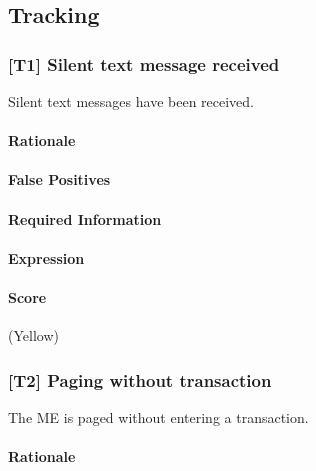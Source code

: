 \documentclass[a4paper,11pt,notitlepage,bigheadings,oneside]{scrartcl}
\begin{document}
\TBD{}

\subsection{Tracking}

\subsubsection{[T1] Silent text message received}

Silent text messages have been received.

\paragraph{Rationale}

\TBD{}

\paragraph{False Positives}


\paragraph{Required Information}

\TBD{}

\paragraph{Expression}

\TBD{}

\paragraph{Score}

\TBD{} (Yellow)

\subsubsection{[T2] Paging without transaction}

The ME is paged without entering a transaction.

\paragraph{Rationale}
\end{document}
